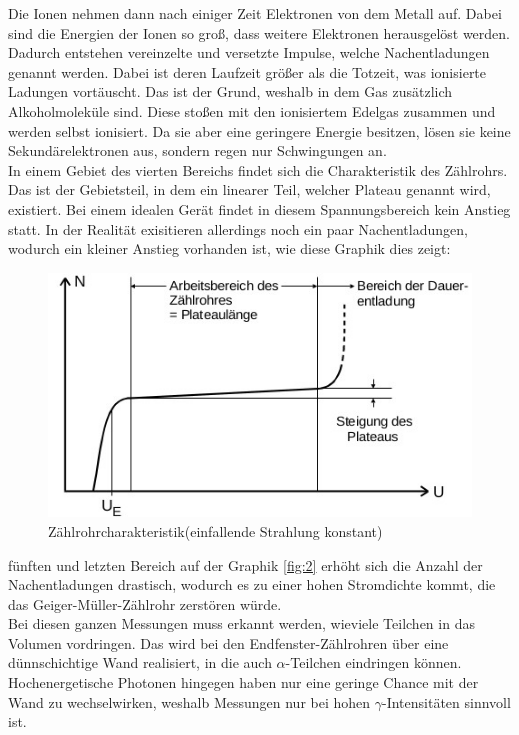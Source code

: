 Die Ionen nehmen dann nach einiger Zeit Elektronen von dem Metall auf. Dabei sind
die Energien der Ionen so groß, dass weitere Elektronen herausgelöst werden.
Dadurch entstehen vereinzelte und versetzte Impulse, welche Nachentladungen
genannt werden. Dabei ist deren Laufzeit größer als die Totzeit, was 
ionisierte Ladungen vortäuscht.
Das ist der Grund, weshalb in dem Gas zusätzlich Alkoholmoleküle sind. Diese
stoßen mit den ionisiertem Edelgas zusammen und werden selbst ionisiert.
Da sie aber eine geringere Energie besitzen, lösen sie keine Sekundärelektronen aus,
sondern regen nur Schwingungen an.\\
In einem Gebiet des vierten Bereichs findet sich die Charakteristik des Zählrohrs.
Das ist der Gebietsteil, in dem ein linearer Teil, welcher Plateau genannt wird, existiert.
Bei einem idealen Gerät findet in diesem Spannungsbereich kein Anstieg statt.
In der Realität exisitieren allerdings noch ein paar Nachentladungen, wodurch ein kleiner 
Anstieg vorhanden ist, wie diese Graphik dies zeigt: \cite{V703}
\begin{figure}[H]
    \centering
    \includegraphics[width=\linewidth]{images/plateau.jpg}
    \caption{Zählrohrcharakteristik(einfallende Strahlung konstant)}
    \label{fig:4}
\end{figure}
\justifying fünften und letzten Bereich auf der Graphik \ref{fig:2}
erhöht sich die Anzahl der Nachentladungen drastisch, wodurch es zu einer hohen
Stromdichte kommt, die das Geiger-Müller-Zählrohr zerstören würde.\\
Bei diesen ganzen Messungen muss erkannt werden, wieviele Teilchen in das Volumen vordringen.
Das wird bei den Endfenster-Zählrohren über eine dünnschichtige Wand realisiert, in die
auch $\alpha$-Teilchen eindringen können. Hochenergetische Photonen hingegen haben nur eine 
geringe Chance mit der Wand zu wechselwirken, weshalb Messungen nur bei hohen $\gamma$-Intensitäten
sinnvoll ist.

